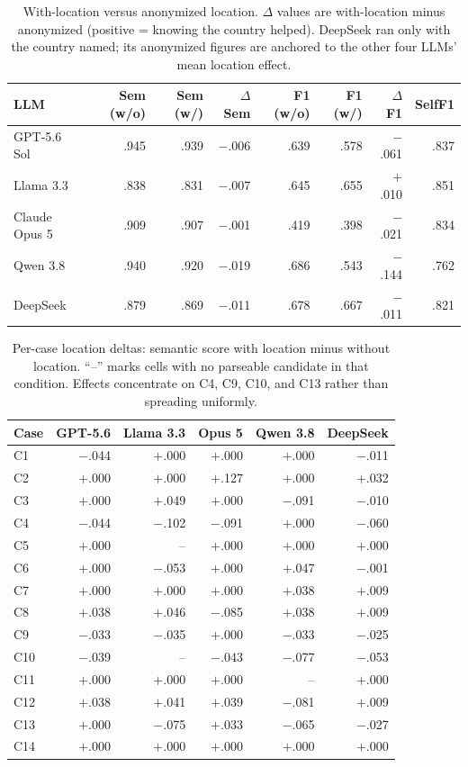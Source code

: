 \documentclass{article}
\begin{document}
\begin{table}[t]
\centering
\small
\caption{With-location versus anonymized location. $\Delta$ values are with-location minus anonymized (positive = knowing the country helped). DeepSeek ran only with the country named; its anonymized figures are anchored to the other four LLMs' mean location effect.}
\label{tab:cultural_locdelta}
\begin{tabular}{lrrrrrrr}
\toprule
LLM & Sem (w/o) & Sem (w/) & $\Delta$ Sem & F1 (w/o) & F1 (w/) & $\Delta$ F1 & SelfF1 \\
\midrule
GPT-5.6 Sol & .945 & .939 & $-$.006 & .639 & .578 & $-$.061 & .837 \\
Llama 3.3 & .838 & .831 & $-$.007 & .645 & .655 & $+$.010 & .851 \\
Claude Opus 5 & .909 & .907 & $-$.001 & .419 & .398 & $-$.021 & .834 \\
Qwen 3.8 & .940 & .920 & $-$.019 & .686 & .543 & $-$.144 & .762 \\
DeepSeek & .879 & .869 & $-$.011 & .678 & .667 & $-$.011 & .821 \\
\bottomrule
\end{tabular}
\end{table}

\begin{table}[p]
\centering
\footnotesize
\caption{Per-case location deltas: semantic score with location minus without location. ``--'' marks cells with no parseable candidate in that condition. Effects concentrate on C4, C9, C10, and C13 rather than spreading uniformly.}
\label{tab:cultural_casedelta}
\begin{tabular}{lrrrrr}
\toprule
Case & GPT-5.6 & Llama 3.3 & Opus 5 & Qwen 3.8 & DeepSeek \\
\midrule
C1 & $-$.044 & $+$.000 & $+$.000 & $+$.000 & $-$.011 \\
C2 & $+$.000 & $+$.000 & $+$.127 & $+$.000 & $+$.032 \\
C3 & $+$.000 & $+$.049 & $+$.000 & $-$.091 & $-$.010 \\
C4 & $-$.044 & $-$.102 & $-$.091 & $+$.000 & $-$.060 \\
C5 & $+$.000 & -- & $+$.000 & $+$.000 & $+$.000 \\
C6 & $+$.000 & $-$.053 & $+$.000 & $+$.047 & $-$.001 \\
C7 & $+$.000 & $+$.000 & $+$.000 & $+$.038 & $+$.009 \\
C8 & $+$.038 & $+$.046 & $-$.085 & $+$.038 & $+$.009 \\
C9 & $-$.033 & $-$.035 & $+$.000 & $-$.033 & $-$.025 \\
C10 & $-$.039 & -- & $-$.043 & $-$.077 & $-$.053 \\
C11 & $+$.000 & $+$.000 & $+$.000 & -- & $+$.000 \\
C12 & $+$.038 & $+$.041 & $+$.039 & $-$.081 & $+$.009 \\
C13 & $+$.000 & $-$.075 & $+$.033 & $-$.065 & $-$.027 \\
C14 & $+$.000 & $+$.000 & $+$.000 & $+$.000 & $+$.000 \\
\bottomrule
\end{tabular}
\end{table}
\end{document}
